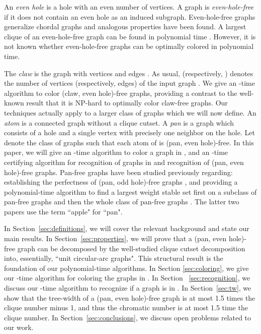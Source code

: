 \documentclass[11pt,a4paper]{article}
\begin{document}
An {\em even hole} is a hole with an even number of vertices. A
graph is {\em even-hole-free} if it does not contain an even hole
as an induced subgraph. Even-hole-free graphs generalize chordal
graphs and analogous properties have been found.
A largest clique of an even-hole-free graph can be found in
polynomial time \cite{actv, AddChu2008, daSV}. However, it is not known whether even-hole-free
graphs can be optimally colored in polynomial time.

The {\it claw} is the graph with vertices  and edges
. As usual,  (respectively, ) denotes the number of vertices
(respectively, edges) of the input graph . We give an -time
algorithm to color (claw, even hole)-free graphs,
providing a contrast to the well-known result \cite{Hol1981} that it is NP-hard
to optimally color claw-free graphs. Our techniques actually apply to a
larger class of graphs which we will now define. An {\it atom  }
is a connected graph without a clique cutset. A {\it pan} is a graph
which consists of a hole and a single vertex with precisely one
neighbor on the hole. Let  denote the class of graphs
 such that each atom of  is (pan, even hole)-free. In this
paper, we will give an -time algorithm to color a graph in
, and an -time certifying algorithm for
recognition of graphs in  and recognition of (pan, even
hole)-free graphs. Pan-free graphs have been studied previously
regarding: establishing the perfectness of (pan, odd hole)-free graphs \cite{Ola1989},
and providing a polynomial-time algorithm to find a largest weight stable
set first on a subclass of pan-free graphs \cite{Des1993} and then the whole
class of pan-free graphs \cite{BraLoz2010}.
The latter two
papers use the term ``apple" for ``pan".

In Section~\ref{sec:definitions}, we will cover the relevant background
and state our main results. In
Section~\ref{sec:properties}, we will prove that a (pan, even
hole)-free graph can be decomposed by the well-studied clique
cutset decomposition into, essentially, ``unit circular-arc
graphs". This structural result is the foundation of our
polynomial-time algorithms. In Section \ref{sec:coloring}, we give
our -time algorithm for coloring the graphs in .
In Section ~\ref{sec:recognition}, we discuss our -time
algorithm to recognize if a graph is in . In
Section~\ref{sec:tw}, we show that the tree-width of a (pan, even
hole)-free graph is at most 1.5 times the clique number minus 1,
and thus the chromatic number is at most 1.5 time the
clique number. In Section~\ref{sec:conclusions}, we discuss open problems
related to our work.
\end{document}

